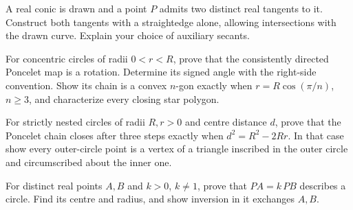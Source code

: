 \begin{exercise}[$\star\star$]\label{geometry:ex:tangentconstruct}
A real conic is drawn and a point $P$ admits two distinct real tangents to it. Construct both tangents with a straightedge alone, allowing intersections with the drawn curve. Explain your choice of auxiliary secants.
\end{exercise}
\begin{exercise}[$\star$]\label{geometry:ex:concentric}
For concentric circles of radii $0<r<R$, prove that the consistently directed Poncelet map is a rotation. Determine its signed angle with the right-side convention. Show its chain is a convex $n$-gon exactly when $r=R\cos(\pi/n)$, $n\ge3$, and characterize every closing star polygon.
\end{exercise}
\begin{exercise}[$\star\star$]\label{geometry:ex:chappleeuler}
For strictly nested circles of radii $R,r>0$ and centre distance $d$, prove that the Poncelet chain closes after three steps exactly when $d^2=R^2-2Rr$. In that case show every outer-circle point is a vertex of a triangle inscribed in the outer circle and circumscribed about the inner one.
\end{exercise}
\begin{exercise}[$\star$]\label{geometry:ex:apolloniuscircle}
For distinct real points $A,B$ and $k>0$, $k\ne1$, prove that $PA=k\,PB$ describes a circle. Find its centre and radius, and show inversion in it exchanges $A,B$.
\end{exercise}

